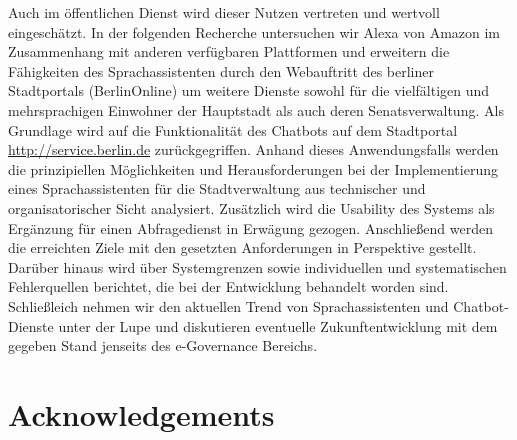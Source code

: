 Auch im öffentlichen Dienst wird dieser Nutzen vertreten und wertvoll eingeschätzt. In der folgenden Recherche untersuchen wir Alexa von Amazon im Zusammenhang mit anderen verfügbaren Plattformen und erweitern die Fähigkeiten des Sprachassistenten durch den Webauftritt des berliner Stadtportals (BerlinOnline) um weitere Dienste sowohl für die vielfältigen und mehrsprachigen Einwohner der Hauptstadt als auch deren Senatsverwaltung. Als Grundlage wird auf die Funktionalität des Chatbots auf dem Stadtportal \href{ https://service.berlin.de/virtueller-assistent/virtueller-assistent-606279.php}{http://service.berlin.de} zurückgegriffen. Anhand dieses Anwendungsfalls werden die prinzipiellen Möglichkeiten und Herausforderungen bei der Implementierung eines Sprachassistenten für die Stadtverwaltung aus technischer und organisatorischer Sicht analysiert. Zusätzlich wird die Usability des Systems als Ergänzung für einen Abfragedienst in Erwägung gezogen. Anschließend werden die erreichten Ziele mit den gesetzten Anforderungen in Perspektive gestellt. Darüber hinaus wird über Systemgrenzen sowie individuellen und systematischen Fehlerquellen berichtet, die bei der Entwicklung behandelt worden sind.\\


Schließleich nehmen wir den aktuellen Trend von Sprachassistenten und Chatbot-Dienste unter der Lupe und diskutieren eventuelle Zukunftentwicklung mit dem gegeben Stand jenseits des e-Governance Bereichs.




\newpage
\chapter*{Acknowledgements}

 \\
\\
\\
